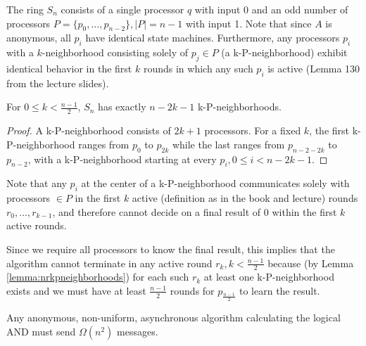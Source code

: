 The ring $S_n$ consists of a single processor $q$ with input 0 and an odd number of processors 
$P = \{ p_0, \ldots, p_{n-2} \}, |P| = n - 1$ with input 1. Note that since $A$ is anonymous, all $p_i$
have identical state machines. Furthermore, any processors $p_i$ with a $k$-neighborhood consisting solely
of $p_j \in P$ (a k-P-neighborhood) exhibit identical behavior in the first $k$ rounds
in which any such $p_i$ is active (Lemma 130 from the lecture slides).

\begin{lemma} \label{lemma:nrkpneighborhoods}
For $0 \leq k < \frac{n-1}{2}$, $S_n$ has exactly $n-2k-1$ k-P-neighborhoods.
\end{lemma}

\begin{proof}
A k-P-neighborhood consists of $2k + 1$ processors. For a fixed $k$, the first
k-P-neighborhood ranges from $p_0$ to $p_{2k}$ while the last ranges from $p_{n-2-2k}$
to $p_{n-2}$, with a k-P-neighborhood starting at every $p_i, 0 \leq i < n - 2k - 1$.
\end{proof}

Note that any $p_i$ at the center of a k-P-neighborhood communicates solely with
processors $\in P$ in the first $k$ active (definition as in the book and lecture)
rounds $r_0, \ldots, r_{k-1}$, and therefore cannot decide on a final result of $0$ within the first $k$
active rounds.

Since we require all processors to know the final result, this implies that the
algorithm cannot terminate in any active round $r_k, k < \frac{n-1}{2}$ because
(by Lemma \ref{lemma:nrkpneighborhoods}) for each such $r_k$ at least one k-P-neighborhood exists and we must have at least
$\frac{n-1}{2}$ rounds for $p_{\frac{n-1}{2}}$ to learn the result.

\begin{theorem} \label{theorem:and_lower_bound}
Any anonymous, non-uniform, asynchronous algorithm calculating the logical AND
must send $\Omega(n^2)$ messages.
\end{theorem}

